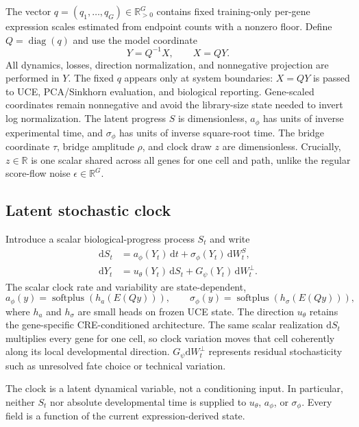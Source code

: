 \documentclass[11pt]{article}
\newcommand{\uce}{UCE}
\newcommand{\R}{\mathbb{R}}
\newcommand{\dd}{\mathrm{d}}
\begin{document}
The vector $q=(q_1,\ldots,q_G)\in\R^G_{>0}$ contains fixed training-only
per-gene expression scales estimated from endpoint counts with a nonzero
floor. Define $Q=\operatorname{diag}(q)$ and use the model coordinate
\begin{equation}
  Y=Q^{-1}X,\qquad X=QY.
  \label{eq:coordinate-transform}
\end{equation}
All dynamics, losses, direction normalization, and nonnegative projection are
performed in $Y$. The fixed $q$ appears only at system boundaries: $X=QY$ is
passed to \uce{}, PCA/Sinkhorn evaluation, and biological reporting.
Gene-scaled coordinates remain nonnegative and avoid the library-size state
needed to invert log normalization. The latent progress $S$ is dimensionless,
$a_\phi$ has units of inverse experimental time, and $\sigma_\phi$ has units
of inverse square-root time. The bridge coordinate $\tau$, bridge amplitude
$\rho$, and clock draw $z$ are dimensionless. Crucially, $z\in\R$ is one
scalar shared across all genes for one cell and path, unlike the regular
score-flow noise $\epsilon\in\R^G$.

\subsection{Latent stochastic clock}

Introduce a scalar biological-progress process $S_t$ and write
\begin{align}
  \dd S_t &= a_\phi(Y_t)\,\dd t + \sigma_\phi(Y_t)\,\dd W_t^{S},
  \label{eq:clock-sde}\\
  \dd Y_t &= u_\theta(Y_t)\,\dd S_t
             + G_\psi(Y_t)\,\dd W_t^{\perp}.
  \label{eq:expression-sde}
\end{align}
The scalar clock rate and variability are state-dependent,
\begin{equation}
  a_\phi(y)=\operatorname{softplus}\!\left(h_a(E(Qy))\right),
  \qquad
  \sigma_\phi(y)=\operatorname{softplus}\!\left(h_\sigma(E(Qy))\right),
  \label{eq:clock-heads}
\end{equation}
where $h_a$ and $h_\sigma$ are small heads on frozen \uce{} state. The
direction $u_\theta$ retains the gene-specific CRE-conditioned architecture.
The same scalar realization $\dd S_t$ multiplies every gene for one cell, so
clock variation moves that cell coherently along its local developmental
direction. $G_\psi\dd W_t^\perp$ represents residual stochasticity such as
unresolved fate choice or technical variation.

The clock is a latent dynamical variable, not a conditioning input. In
particular, neither $S_t$ nor absolute developmental time is supplied to
$u_\theta$, $a_\phi$, or $\sigma_\phi$. Every field is a function of the
current expression-derived state.
\end{document}
